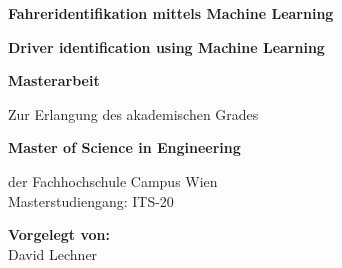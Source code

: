 \begin{center}

\vspace{4.9cm}

\hspace*{-1.0cm} {\LARGE \textbf{Fahreridentifikation mittels Machine Learning\\}}
\vspace{0.2cm}

\vspace{1cm}

\hspace*{-1.0cm} {\LARGE \textbf{Driver identification using Machine Learning\\}}
\vspace{0.2cm}

\vspace{2.7cm}

\hspace*{-1.0cm} {\LARGE \textbf{Masterarbeit\\}}

\vspace{0.65cm}

\hspace*{-1.0cm} Zur Erlangung des akademischen Grades \\

\vspace{0.65cm}

\hspace*{-1.0cm} \textbf{Master of Science in Engineering\\}

\vspace{0.65cm}

\hspace*{-1.0cm} der Fachhochschule Campus Wien \\
\vspace{0.2cm}
\hspace*{-1.0cm} Masterstudiengang: ITS-20 \\

\vspace{1.6cm}

\hspace*{-1.0cm} \textbf{Vorgelegt von:} \\
\vspace{0.2cm}
\hspace*{-1.0cm} David Lechner \\

\vspace{0.7cm}


\end{center}
